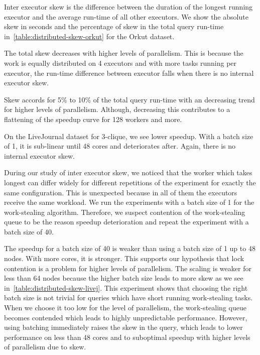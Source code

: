 Inter executor skew is the difference between the duration of the longest running executor and the average
run-time of all other executors.
We show the absolute skew in seconds and the percentage of skew in the total query run-time
in~\cref{table:distributed-skew-orkut} for the Orkut dataset.

The total skew decreases with higher levels of parallelism.
This is because the work is equally distributed on 4 executors and with more tasks running per executor,
the run-time difference between executor falls when there is no internal executor skew.

Skew accords for 5\% to 10\% of the total query run-time with an decreasing trend for higher levels of
parallelism.
Although, decreasing this contributes to a flattening of the speedup curve for 128 workers and more.

On the LiveJournal dataset for 3-clique, we see lower speedup.
With a batch size of 1, it is sub-linear until 48 cores and deteriorates after.
Again, there is no internal executor skew.

During our study of inter executor skew, we noticed that the worker which takes longest can differ widely
for different repetitions of the experiment for exactly the same configuration.
This is unexpected because in all of them the executors receive the same workload.
We run the experiments with a batch size of 1 for the work-stealing algorithm.
Therefore, we suspect contention of the work-stealing queue to be the reason speedup deterioration and
repeat the experiment with a batch size of 40.

The speedup for a batch size of 40 is weaker than using a batch size of 1 up to 48 nodes.
With more cores, it is stronger.
This supports our hypothesis that lock contention is a problem for higher levels of parallelism.
The scaling is weaker for less than 64 nodes because the higher batch size leads to more skew as we see
in~\cref{table:distributed-skew-livej}.
This experiment shows that choosing the right batch size is not trivial for queries which have
short running work-stealing tasks.
When we choose it too low for the level of parallelism, the work-stealing queue becomes contended which leads
to highly unpredictable performance.
However, using batching immediately raises the skew in the query, which leads to lower performance on less
than 48 cores and to suboptimal speedup with higher levels of parallelism due to skew.


